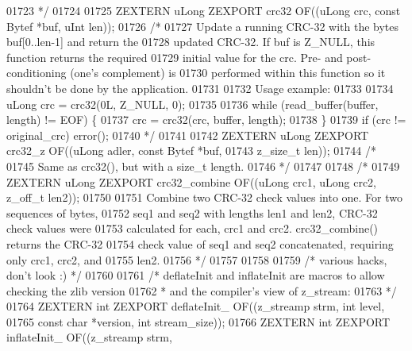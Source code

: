 \begin{DoxyCode}
01723 \textcolor{comment}{*/}
01724 
01725 ZEXTERN uLong ZEXPORT crc32   OF((uLong crc, \textcolor{keyword}{const} Bytef *buf, uInt len));
01726 \textcolor{comment}{/*}
01727 \textcolor{comment}{     Update a running CRC-32 with the bytes buf[0..len-1] and return the}
01728 \textcolor{comment}{   updated CRC-32.  If buf is Z\_NULL, this function returns the required}
01729 \textcolor{comment}{   initial value for the crc.  Pre- and post-conditioning (one's complement) is}
01730 \textcolor{comment}{   performed within this function so it shouldn't be done by the application.}
01731 \textcolor{comment}{}
01732 \textcolor{comment}{   Usage example:}
01733 \textcolor{comment}{}
01734 \textcolor{comment}{     uLong crc = crc32(0L, Z\_NULL, 0);}
01735 \textcolor{comment}{}
01736 \textcolor{comment}{     while (read\_buffer(buffer, length) != EOF) \{}
01737 \textcolor{comment}{       crc = crc32(crc, buffer, length);}
01738 \textcolor{comment}{     \}}
01739 \textcolor{comment}{     if (crc != original\_crc) error();}
01740 \textcolor{comment}{*/}
01741 
01742 ZEXTERN uLong ZEXPORT crc32\_z OF((uLong adler, \textcolor{keyword}{const} Bytef *buf,
01743                                   z\_size\_t len));
01744 \textcolor{comment}{/*}
01745 \textcolor{comment}{     Same as crc32(), but with a size\_t length.}
01746 \textcolor{comment}{*/}
01747 
01748 \textcolor{comment}{/*}
01749 \textcolor{comment}{ZEXTERN uLong ZEXPORT crc32\_combine OF((uLong crc1, uLong crc2, z\_off\_t len2));}
01750 \textcolor{comment}{}
01751 \textcolor{comment}{     Combine two CRC-32 check values into one.  For two sequences of bytes,}
01752 \textcolor{comment}{   seq1 and seq2 with lengths len1 and len2, CRC-32 check values were}
01753 \textcolor{comment}{   calculated for each, crc1 and crc2.  crc32\_combine() returns the CRC-32}
01754 \textcolor{comment}{   check value of seq1 and seq2 concatenated, requiring only crc1, crc2, and}
01755 \textcolor{comment}{   len2.}
01756 \textcolor{comment}{*/}
01757 
01758 
01759                         \textcolor{comment}{/* various hacks, don't look :) */}
01760 
01761 \textcolor{comment}{/* deflateInit and inflateInit are macros to allow checking the zlib version}
01762 \textcolor{comment}{ * and the compiler's view of z\_stream:}
01763 \textcolor{comment}{ */}
01764 ZEXTERN \textcolor{keywordtype}{int} ZEXPORT deflateInit\_ OF((z\_streamp strm, \textcolor{keywordtype}{int} level,
01765                                      \textcolor{keyword}{const} \textcolor{keywordtype}{char} *version, \textcolor{keywordtype}{int} stream\_size));
01766 ZEXTERN \textcolor{keywordtype}{int} ZEXPORT inflateInit\_ OF((z\_streamp strm,

\end{DoxyCode}
